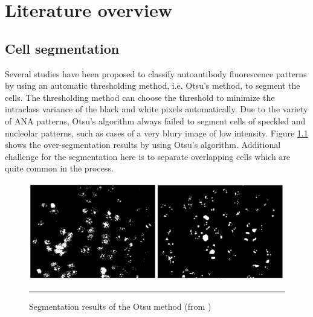 
\chapter{Literature overview} 

\label{Chapter3} %



\section{Cell segmentation}

Several studies have been proposed to classify autoantibody fluorescence patterns by using an automatic thresholding method, i.e.  Otsu's method, to segment the cells. The  thresholding method can choose the threshold to minimize the intraclass variance of the black and white pixels automatically. Due to the variety of ANA patterns,  Otsu's algorithm always failed to segment cells of speckled and nucleolar patterns, such as cases of a very blury image of low intensity. Figure \ref{fig:BadSegment} shows the over-segmentation results by using Otsu's algorithm. Additional challenge for the segmentation here is to separate overlapping cells which are quite common in the process.

\begin{figure}[htbp]
	\centering
	\includegraphics[scale=0.4]{Figures/introduction/badsegmentation}
	\rule{35em}{0.5pt}
	\caption[Bad segmentation example]{Segmentation results of the Otsu method (from \cite{Huang2008})}
	\label{fig:BadSegment}

\end{figure}


